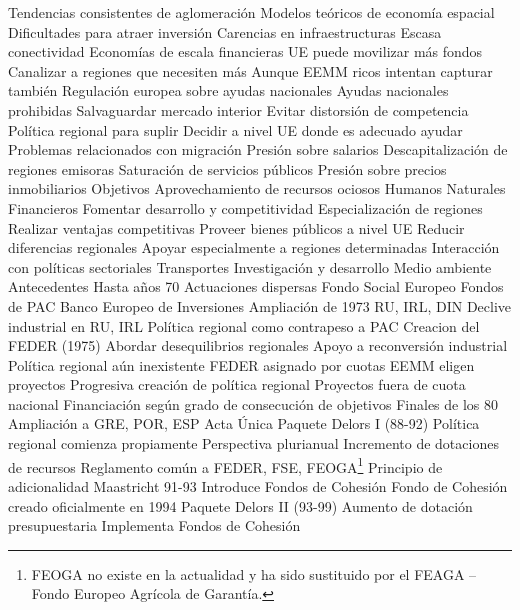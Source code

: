 \documentclass{nuevotema}
\begin{document}
\begin{esquemal}
				\4[] Tendencias consistentes de aglomeración
				\4[] Modelos teóricos de economía espacial
			\3 Dificultades para atraer inversión
				\4 Carencias en infraestructuras
				\4 Escasa conectividad
			\3 Economías de escala financieras
				\4 UE puede movilizar más fondos
				\4 Canalizar a regiones que necesiten más
				\4[] Aunque EEMM ricos intentan capturar también
			\3 Regulación europea sobre ayudas nacionales
				\4 Ayudas nacionales prohibidas
				\4[] Salvaguardar mercado interior
				\4[] Evitar distorsión de competencia
				\4 Política regional para suplir
				\4[] Decidir a nivel UE donde es adecuado ayudar
			\3 Problemas relacionados con migración
				\4 Presión sobre salarios
				\4 Descapitalización de regiones emisoras
				\4 Saturación de servicios públicos
				\4 Presión sobre precios inmobiliarios
		\2 Objetivos
			\3 Aprovechamiento de recursos ociosos
				\4 Humanos
				\4 Naturales
				\4 Financieros
			\3 Fomentar desarrollo y competitividad
				\4 Especialización de regiones
				\4[] Realizar ventajas competitivas
				\4 Proveer bienes públicos a nivel UE
			\3 Reducir diferencias regionales
				\4 Apoyar especialmente a regiones determinadas
			\3 Interacción con políticas sectoriales
				\4 Transportes
				\4 Investigación y desarrollo
				\4 Medio ambiente
		\2 Antecedentes
			\3 Hasta años 70
				\4 Actuaciones dispersas
				\4[] Fondo Social Europeo
				\4[] Fondos de PAC
				\4[] Banco Europeo de Inversiones
			\3 Ampliación de 1973
				\4 RU, IRL, DIN
				\4 Declive industrial en RU, IRL
				\4 Política regional como contrapeso a PAC
			\3 Creacion del FEDER (1975)
				\4 Abordar desequilibrios regionales
				\4 Apoyo a reconversión industrial
				\4 Política regional aún inexistente
				\4[] FEDER asignado por cuotas
				\4[] EEMM eligen proyectos
				\4 Progresiva creación de política regional
				\4[] Proyectos fuera de cuota nacional
				\4[] Financiación según grado de consecución de objetivos
			\3 Finales de los 80
				\4 Ampliación a GRE, POR, ESP
				\4 Acta Única
				\4 Paquete Delors I (88-92)
				\4[] Política regional comienza propiamente
				\4[] Perspectiva plurianual
				\4[] Incremento de dotaciones de recursos
				\4[] Reglamento común a FEDER, FSE, FEOGA\footnote{FEOGA no existe en la actualidad y ha sido sustituido por el FEAGA -- Fondo Europeo Agrícola de Garantía.}
				\4 Principio de adicionalidad
			\3 Maastricht 91-93
				\4 Introduce Fondos de Cohesión
				\4 Fondo de Cohesión creado oficialmente en 1994
			\3 Paquete Delors II (93-99)
				\4 Aumento de dotación presupuestaria
				\4 Implementa Fondos de Cohesión

\end{esquemal}
\end{document}
